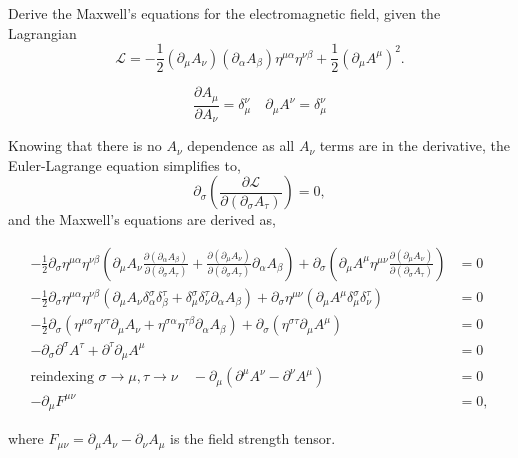 \begin{Question}
  Derive the Maxwell's equations for the electromagnetic field, given the Lagrangian
  \begin{equation}
    \mathcal{L} = -\frac{1}{2}(\partial_\mu A_\nu)(\partial_\alpha A_\beta)\eta^{\mu\alpha}\eta^{\nu\beta} + \frac{1}{2}(\partial_\mu A^\mu)^2.
  \end{equation}
\end{Question}
\begin{lemma}
  \begin{equation}
    \frac{\partial A_\mu }{\partial A_\nu} = \delta^\nu_\mu \quad \partial_\mu A^\nu = \delta^\nu_\mu
  \end{equation}
  \vspace{-0.5cm}
\end{lemma}
  
Knowing that there is no $A_\nu$ dependence as all $A_\nu$ terms are in the derivative, the Euler-Lagrange equation simplifies to,
\begin{equation}
  \partial_\sigma \left(\frac{\partial \mathcal{L}}{\partial (\partial_\sigma A_\tau)}\right) = 0,
\end{equation}
and the Maxwell's equations are derived as,
\begin{derivation}
\begin{equation}
  \begin{aligned}
    -\frac{1}{2} \partial_\sigma \eta^{\mu\alpha}\eta^{\nu\beta} \left(\partial_\mu A_\nu \frac{\partial(\partial_\alpha A_\beta)}{\partial (\partial_\sigma A_\tau)} + \frac{\partial(\partial_\mu A_\nu)}{\partial (\partial_\sigma A_\tau)}\partial_\alpha A_\beta\right) + \partial_\sigma\left(\partial_\mu A^\mu \eta^{\mu\nu}\frac{\partial(\partial_\mu A_\nu)}{\partial (\partial_\sigma A_\tau)}\right) &= 0\\
    -\frac{1}{2} \partial_\sigma \eta^{\mu\alpha}\eta^{\nu\beta} \left(\partial_\mu A_\nu \delta^\sigma_\alpha \delta^\tau_\beta + \delta^\sigma_\mu \delta^\tau_\nu \partial_\alpha A_\beta\right) +  \partial_\sigma \eta^{\mu\nu} \left(\partial_\mu A^\mu \delta^\sigma_\mu \delta^\tau_\nu\right) &= 0\\
    -\frac{1}{2} \partial_\sigma \left(\eta^{\mu\sigma}\eta^{\nu\tau}\partial_\mu A_\nu + \eta^{\sigma\alpha}\eta^{\tau\beta}\partial_\alpha A_\beta\right) +  \partial_\sigma \left(\eta^{\sigma\tau}\partial_\mu A^\mu\right) &= 0\\
   -\partial_\sigma \partial^\sigma A^\tau + \partial^\tau \partial_\mu A^\mu &= 0\\
   \text{reindexing }\sigma\rightarrow\mu, \tau\rightarrow\nu \quad -\partial_\mu (\partial^\mu A^\nu - \partial ^\nu A^\mu) &= 0\\
   -\partial_\mu F^{\mu\nu} &= 0,
  \end{aligned}
\end{equation}
\end{derivation}
where $F_{\mu\nu} = \partial_\mu A_\nu - \partial_\nu A_\mu$ is the \textsf{field strength tensor}.
